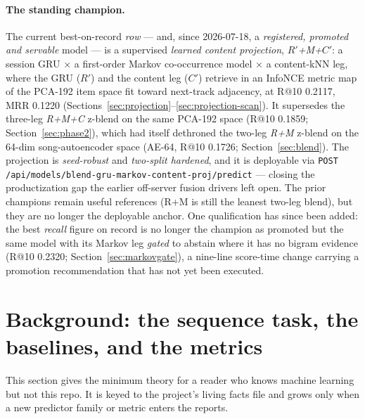 \documentclass[11pt]{article}
\newcommand{\Rp}{\ensuremath{R'}}
\newcommand{\Cp}{\ensuremath{C'}}
\begin{document}
\paragraph{The standing champion.} The current best-on-record \emph{row} ---
and, since 2026-07-18, a \emph{registered, promoted and servable} model --- is a
supervised \emph{learned content projection}, \emph{\Rp+M+\Cp}: a session GRU
$\times$ a first-order Markov co-occurrence model $\times$ a content-kNN leg,
where the GRU (\Rp) and the content leg (\Cp) retrieve in an InfoNCE metric map
of the PCA-192 item space fit toward next-track adjacency, at R@10 \num{0.2117},
MRR \num{0.1220} (Sections~\ref{sec:projection}--\ref{sec:projection-scan}). It
supersedes the three-leg \emph{R+M+C} z-blend on the same PCA-192 space (R@10
\num{0.1859}; Section~\ref{sec:phase2}), which had itself dethroned the two-leg
\emph{R+M} z-blend on the 64-dim song-autoencoder space (AE-64, R@10
\num{0.1726}; Section~\ref{sec:blend}). The projection is \emph{seed-robust} and
\emph{two-split hardened}, and it is deployable via
\texttt{POST /api/models/blend-gru-markov-content-proj/predict} --- closing the
productization gap the earlier off-server fusion drivers left open. The prior
champions remain useful references (R+M is still the leanest two-leg blend), but
they are no longer the deployable anchor. One qualification has since been added:
the best \emph{recall} figure on record is no longer the champion as promoted but
the same model with its Markov leg \emph{gated} to abstain where it has no bigram
evidence (R@10 \num{0.2320}; Section~\ref{sec:markovgate}), a nine-line score-time
change carrying a promotion recommendation that has not yet been executed.

\section{Background: the sequence task, the baselines, and the metrics}
\label{sec:background}
This section gives the minimum theory for a reader who knows machine learning
but not this repo. It is keyed to the project's living facts file and grows only
when a new predictor family or metric enters the reports.
\end{document}
